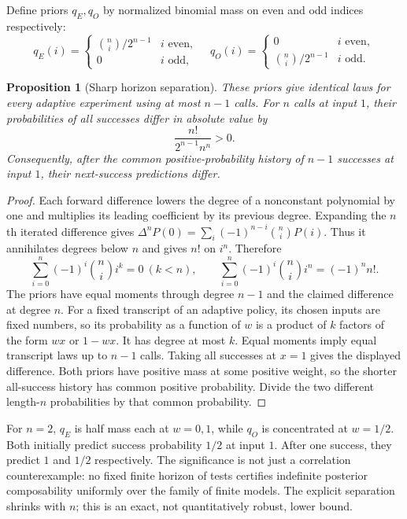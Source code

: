 \documentclass[11pt]{article}
\newtheorem{proposition}{Proposition}
\begin{document}
Define priors $q_E,q_O$ by normalized binomial mass on even and odd indices respectively:
\[q_E(i)=\begin{cases}\binom ni/2^{n-1}&i\text{ even},\\0&i\text{ odd},\end{cases}
\quad q_O(i)=\begin{cases}0&i\text{ even},\\\binom ni/2^{n-1}&i\text{ odd}.\end{cases}\]
\begin{proposition}[Sharp horizon separation]\label{prop:horizon}
These priors give identical laws for every adaptive experiment using at most $n-1$ calls. For $n$ calls at input $1$, their probabilities of all successes differ in absolute value by
\[\frac{n!}{2^{n-1}n^n}>0.\]
Consequently, after the common positive-probability history of $n-1$ successes at input $1$, their next-success predictions differ.
\end{proposition}
\begin{proof}
Each forward difference lowers the degree of a nonconstant polynomial by one and multiplies its leading coefficient by its previous degree. Expanding the $n$th iterated difference gives $\Delta^n P(0)=\sum_i(-1)^{n-i}\binom ni P(i)$. Thus it annihilates degrees below $n$ and gives $n!$ on $i^n$. Therefore
\[\sum_{i=0}^n(-1)^i\binom ni i^k=0\ (k<n),\qquad
\sum_{i=0}^n(-1)^i\binom ni i^n=(-1)^n n!.\]
The priors have equal moments through degree $n-1$ and the claimed difference at degree $n$. For a fixed transcript of an adaptive policy, its chosen inputs are fixed numbers, so its probability as a function of $w$ is a product of $k$ factors of the form $wx$ or $1-wx$. It has degree at most $k$. Equal moments imply equal transcript laws up to $n-1$ calls. Taking all successes at $x=1$ gives the displayed difference. Both priors have positive mass at some positive weight, so the shorter all-success history has common positive probability. Divide the two different length-$n$ probabilities by that common probability.
\end{proof}
For $n=2$, $q_E$ is half mass each at $w=0,1$, while $q_O$ is concentrated at $w=1/2$. Both initially predict success probability $1/2$ at input $1$. After one success, they predict $1$ and $1/2$ respectively. The significance is not just a correlation counterexample: no fixed finite horizon of tests certifies indefinite posterior composability uniformly over the family of finite models. The explicit separation shrinks with $n$; this is an exact, not quantitatively robust, lower bound.
\end{document}
